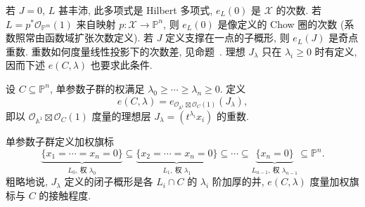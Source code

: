 若 $J=0$, $L$ 甚丰沛, 此多项式是 Hilbert 多项式, $e_L(0)$ 是 $\mathcal X$ 的次数. 若 $L=p^*\mathcal O_{\mathbb P^m}(1)$ 来自映射 $p:\mathcal X\to\mathbb P^n$, 则 $e_L(0)$ 是像定义的 Chow 圈的次数 (系数照常由函数域扩张次数定义). 若 $J$ 定义支撑在一点的子概形, 则 $e_L(J)$ 是奇点重数. 重数如何度量线性投影下的次数差, 见命题~. 理想 $J_\lambda$ 只在 $\lambda_i\geq0$ 时有定义, 因而下述 $e(C,\allowbreak \lambda)$ 也要求此条件.
\begin{definition}\label{src:6.8.10}
设 $C\subseteq\mathbb P^n$, 单参数子群的权满足 $\lambda_0\geq\cdots\geq\lambda_n\geq0$. 定义
\[
e(C,\lambda)=e_{\mathcal O_{\mathbb A^1}\boxtimes\mathcal O_C(1)}(J_\lambda),
\]
即以 $\mathcal O_{\mathbb A^1}\boxtimes\mathcal O_C(1)$ 度量的理想层 $J_\lambda=(t^{\lambda_i}x_i)$ 的重数.
\end{definition}
单参数子群定义加权旗标
\[
\underbrace{\{x_1=\cdots=x_n=0\}}_{L_0,\ \text{权 }\lambda_0}
\subseteq\underbrace{\{x_2=\cdots=x_n=0\}}_{L_1,\ \text{权 }\lambda_1}
\subseteq\cdots\subseteq\underbrace{\{x_n=0\}}_{L_{n-1},\ \text{权 }\lambda_{n-1}}\subseteq\mathbb P^n.
\]
粗略地说, $J_\lambda$ 定义的闭子概形是各 $L_i\cap C$ 的 $\lambda_i$ 阶加厚的并, $e(C,\allowbreak \lambda)$ 度量加权旗标与 $C$ 的接触程度.

